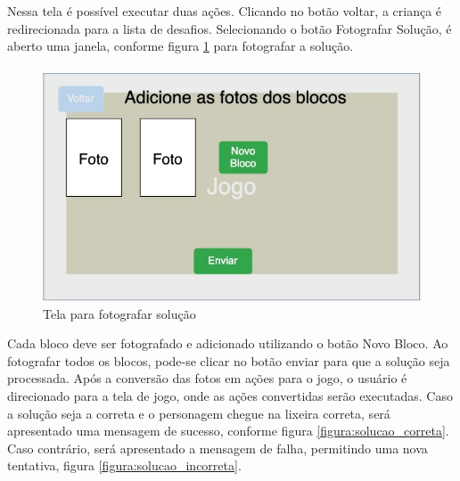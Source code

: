    Nessa tela é possível executar duas ações.
    Clicando no botão voltar, a criança é redirecionada para a lista de desafios.
    Selecionando o botão Fotografar Solução, é aberto uma janela, conforme figura \ref{figura:fotografar_blocos} para fotografar a solução.
    
    \begin{figure}[H]
        \caption{Tela para fotografar solução}
        \begin{center}
            \includegraphics[width=\linewidth]{Imagens/cap3/Fotografar_blocos.jpg}
        \end{center}
        \label{figura:fotografar_blocos}
    \end{figure}
    
    Cada bloco deve ser fotografado e adicionado utilizando o botão Novo Bloco.
    Ao fotografar todos os blocos, pode-se clicar no botão enviar para que a solução seja processada.
    Após a conversão das fotos em ações para o jogo, o usuário é direcionado para a tela de jogo, onde as ações convertidas serão executadas.
    Caso a solução seja a correta e o personagem chegue na lixeira correta, será apresentado uma mensagem de sucesso, conforme figura \ref{figura:solucao_correta}. Caso contrário, será apresentado a mensagem de falha, permitindo uma nova tentativa, figura \ref{figura:solucao_incorreta}.
    
